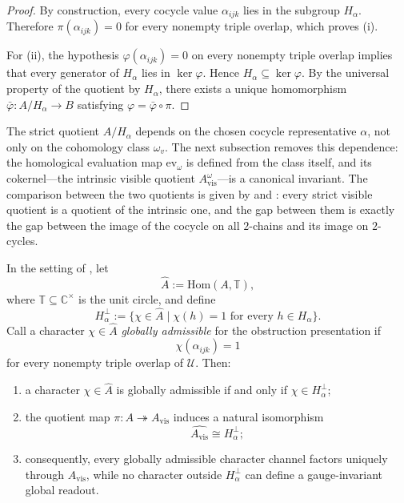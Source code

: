 \begin{proof}
By construction, every cocycle value $\alpha_{ijk}$ lies in the subgroup $H_\alpha$. Therefore $\pi(\alpha_{ijk})=0$ for every nonempty triple overlap, which proves (i).

For (ii), the hypothesis $\varphi(\alpha_{ijk})=0$ on every nonempty triple overlap implies that every generator of $H_\alpha$ lies in $\ker\varphi$. Hence $H_\alpha\subseteq\ker\varphi$. By the universal property of the quotient by $H_\alpha$, there exists a unique homomorphism $\bar\varphi:A/H_\alpha\to B$ satisfying $\varphi=\bar\varphi\circ\pi$.
\end{proof}

The strict quotient $A/H_\alpha$ depends on the chosen cocycle representative $\alpha$, not only on the cohomology class $\omega_v$. The next subsection removes this dependence: the homological evaluation map $\mathrm{ev}_\omega$ is defined from the class itself, and its cokernel---the intrinsic visible quotient $A_{\mathrm{vis}}^\omega$---is a canonical invariant. The comparison between the two quotients is given by  and : every strict visible quotient is a quotient of the intrinsic one, and the gap between them is exactly the gap between the image of the cocycle on all $2$-chains and its image on $2$-cycles.

\begin{theorem}\label{thm:character-definability-barrier}
In the setting of , let
\[
\widehat A:=\mathrm{Hom}(A,\mathbb T),
\]
where $\mathbb T\subseteq\mathbb C^\times$ is the unit circle, and define
\[
H_\alpha^\perp:=\{\chi\in\widehat A\mid \chi(h)=1\text{ for every }h\in H_\alpha\}.
\]
Call a character $\chi\in\widehat A$ \emph{globally admissible} for the obstruction presentation if
\[
\chi(\alpha_{ijk})=1
\]
for every nonempty triple overlap of $\mathcal U$. Then:
\begin{enumerate}[label=(\roman*),nosep]
\item a character $\chi\in\widehat A$ is globally admissible if and only if $\chi\in H_\alpha^\perp$;
\item the quotient map $\pi:A\twoheadrightarrow A_{\mathrm{vis}}$ induces a natural isomorphism
\[
\widehat{A_{\mathrm{vis}}}\cong H_\alpha^\perp;
\]
\item consequently, every globally admissible character channel factors uniquely through $A_{\mathrm{vis}}$, while no character outside $H_\alpha^\perp$ can define a gauge-invariant global readout.
\end{enumerate}
\end{theorem}

